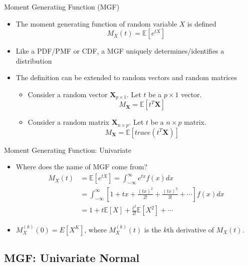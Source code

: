 \documentclass[
  ignorenonframetext,
]{beamer}
\providecommand{\tightlist}{%
  \setlength{\itemsep}{0pt}\setlength{\parskip}{0pt}}
\begin{document}
\begin{frame}{Moment Generating Function (MGF)}
\protect\hypertarget{moment-generating-function-mgf}{}
\begin{itemize}
\tightlist
\item
  The moment generating function of random variable \(X\) is defined
  \[M_X(t)=\mathbb{E}[e^{tX}]\]
\item
  Like a PDF/PMF or CDF, a MGF uniquely determines/identifies a
  distribution
\item
  The definition can be extended to random vectors and random matrices

  \begin{itemize}
  \tightlist
  \item
    Consider a random vector \(\mathbf X_{p\times 1}\). Let \(t\) be a
    \(p\times 1\) vector. \[M_{\mathbf X}= \mathbb E [t^T\mathbf X]\]
  \item
    Consider a random matrix \(\mathbf X_{n\times p}\). Let \(t\) be a
    \(n\times p\) matrix.
    \[M_{\mathbf X}= \mathbb E [trace(t^T\mathbf X)]\]
  \end{itemize}
\end{itemize}
\end{frame}

\begin{frame}{Moment Generating Function: Univariate}
\protect\hypertarget{moment-generating-function-univariate}{}
\begin{itemize}
\item
  Where does the name of MGF come from? \[
  \begin{aligned}
  M_X(t) &= \mathbb{E}[e^{tX}] = \int_{-\infty}^{\infty} e^{tx} f(x) dx\\
  &=\int_{-\infty}^{\infty} [1 + tx + \frac{(tx)^2}{2!} + \frac{(tx)^3}{3!} + \cdots] f(x) dx\\
  &= 1+ t\mathbb{E}[X] + \frac{t^2}{2!}\mathbb{E}[X^2] + \cdots
  \end{aligned}
  \]
\item
  \(M^{(k)}_X(0)=E[X^K]\), where \(M^{(k)}_X(t)\) is the \(k\)th
  derivative of \(M_X(t)\).
\end{itemize}
\end{frame}

\hypertarget{mgf-univariate-normal}{%
\subsection{MGF: Univariate Normal}\label{mgf-univariate-normal}}
\end{document}
